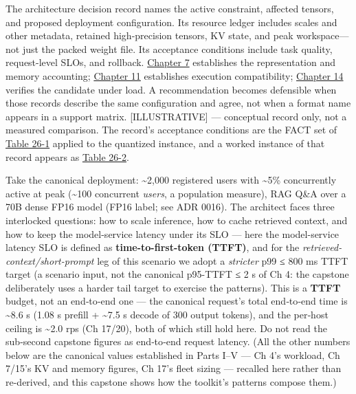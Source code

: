 The architecture decision record names the active constraint, affected
tensors, and proposed deployment configuration. Its resource ledger
includes scales and other metadata, retained high-precision tensors, KV
state, and peak workspace---not just the packed weight file. Its
acceptance conditions include task quality, request-level SLOs, and
rollback. \hyperref[chap:7]{Chapter 7} establishes the representation and memory
accounting; \hyperref[chap:11]{Chapter 11} establishes execution compatibility; \hyperref[chap:14]{Chapter 14}
verifies the candidate under load. A recommendation becomes defensible
when those records describe the same configuration and agree, not when a
format name appears in a support matrix. \mbox{{[}ILLUSTRATIVE{]}} ---
conceptual record only, not a measured comparison. The record's
acceptance conditions are the FACT set of \hyperref[tab:26.1]{Table 26-1} applied to the
quantized instance, and a worked instance of that record appears as
\hyperref[tab:26.2]{Table 26-2}.

\label{worked-example-capstone-scenario}


Take the canonical deployment: \textasciitilde2,000 registered users
with \textasciitilde5\% concurrently active at peak (\textasciitilde100
concurrent \emph{users}, a population measure), RAG Q\&A over a 70B
dense FP16 model (FP16 label; see ADR 0016). The architect faces three
interlocked questions: how to scale inference, how to cache retrieved
context, and how to keep the model-service latency under its SLO ---
here the model-service latency SLO is defined as
\textbf{time-to-first-token (TTFT)}, and for the
\emph{retrieved-context/short-prompt} leg of this scenario we adopt a
\emph{stricter} p99 ≤ 800 ms TTFT target (a scenario input, not the
canonical p95-TTFT ≤ 2 s of Ch 4: the capstone deliberately uses a
harder tail target to exercise the patterns). This is a \textbf{TTFT}
budget, not an end‑to‑end one --- the canonical request's total
end‑to‑end time is \textasciitilde8.6 s (1.08 s prefill +
\textasciitilde7.5 s decode of 300 output tokens), and the per‑host
ceiling is \textasciitilde2.0 rps (Ch 17/20), both of which still hold
here. Do not read the sub‑second capstone figures as end‑to‑end request
latency. (All the other numbers below are the canonical values
established in Parts I--V --- Ch 4's workload, Ch 7/15's KV and memory
figures, Ch 17's fleet sizing --- recalled here rather than re-derived,
and this capstone shows how the toolkit's patterns compose them.)

